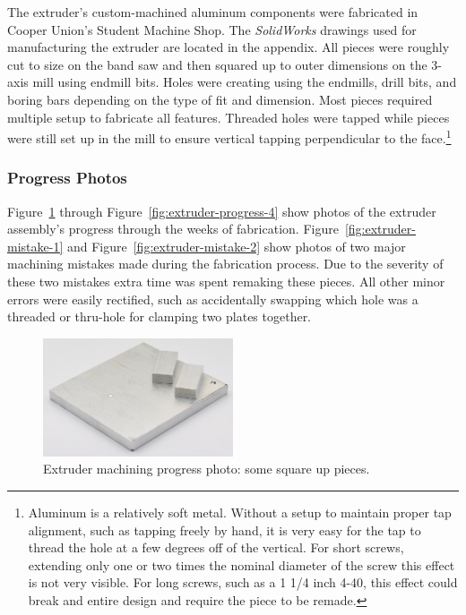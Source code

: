 \indent

The extruder's custom-machined aluminum components were fabricated in Cooper Union's Student Machine Shop. The \emph{SolidWorks} drawings used for manufacturing the extruder are located in the appendix. All pieces were roughly cut to size on the band saw and then squared up to outer dimensions on the 3-axis mill using endmill bits. Holes were creating using the endmills, drill bits, and boring bars depending on the type of fit and dimension. Most pieces required multiple setup to fabricate all features. Threaded holes were tapped while pieces were still set up in the mill to ensure vertical tapping perpendicular to the face.\footnote{Aluminum is a relatively soft metal. Without a setup to maintain proper tap alignment, such as tapping freely by hand, it is very easy for the tap to thread the hole at a few degrees off of the vertical. For short screws, extending only one or two times the nominal diameter of the screw this effect is not very visible. For long screws, such as a 1 1/4 inch 4-40, this effect could break and entire design and require the piece to be remade.}\\

\subsubsection{Progress Photos}


\indent

Figure~\ref{fig:extruder-progress-square} through Figure~\ref{fig:extruder-progress-4} show photos of the extruder assembly's progress through the weeks of fabrication. Figure~\ref{fig:extruder-mistake-1} and Figure~\ref{fig:extruder-mistake-2} show photos of two major machining mistakes made during the fabrication process. Due to the severity of these two mistakes extra time was spent remaking these pieces. All other minor errors were easily rectified, such as accidentally swapping which hole was a threaded or thru-hole for clamping two plates together.\\

\begin{figure}[h!]
\centering
\includegraphics[width=0.5\textwidth]{./figures/extruder-progress-square}
\caption{Extruder machining progress photo: some square up pieces.}
\label{fig:extruder-progress-square}
\end{figure}

